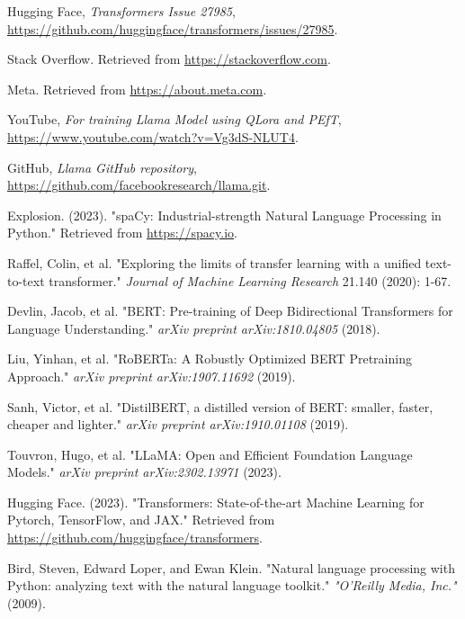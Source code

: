 \documentclass[conference]{IEEEtran}
\begin{document}
\begin{thebibliography}{1}
    Hugging Face, \emph{Transformers Issue 27985}, \href{https://github.com/huggingface/transformers/issues/27985}{https://github.com/huggingface/transformers/issues/27985}.

    Stack Overflow. Retrieved from \url{https://stackoverflow.com}.

    Meta. Retrieved from \url{https://about.meta.com}.

    YouTube, \emph{For training Llama Model using QLora and PEfT}, \href{https://www.youtube.com/watch?v=Vg3dS-NLUT4}{https://www.youtube.com/watch?v=Vg3dS-NLUT4}.

    GitHub, \emph{Llama GitHub repository}, \href{https://github.com/facebookresearch/llama.git}{https://github.com/facebookresearch/llama.git}.

    Explosion. (2023). "spaCy: Industrial-strength Natural Language Processing in Python." Retrieved from \url{https://spacy.io}.

    Raffel, Colin, et al. "Exploring the limits of transfer learning with a unified text-to-text transformer." \emph{Journal of Machine Learning Research} 21.140 (2020): 1-67.

    Devlin, Jacob, et al. "BERT: Pre-training of Deep Bidirectional Transformers for Language Understanding." \emph{arXiv preprint arXiv:1810.04805} (2018).

    Liu, Yinhan, et al. "RoBERTa: A Robustly Optimized BERT Pretraining Approach." \emph{arXiv preprint arXiv:1907.11692} (2019).

    Sanh, Victor, et al. "DistilBERT, a distilled version of BERT: smaller, faster, cheaper and lighter." \emph{arXiv preprint arXiv:1910.01108} (2019).

    Touvron, Hugo, et al. "LLaMA: Open and Efficient Foundation Language Models." \emph{arXiv preprint arXiv:2302.13971} (2023).

    Hugging Face. (2023). "Transformers: State-of-the-art Machine Learning for Pytorch, TensorFlow, and JAX." Retrieved from \url{https://github.com/huggingface/transformers}.

    Bird, Steven, Edward Loper, and Ewan Klein. "Natural language processing with Python: analyzing text with the natural language toolkit." \emph{"O'Reilly Media, Inc."} (2009).


\end{thebibliography}
\end{document}
